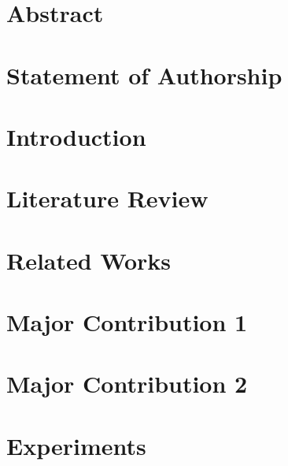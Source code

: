 \documentclass[twoside,openright,titlepage,numbers=noenddot,headinclude,footinclude=true,cleardoublepage=empty,listof=totoc,paper=a4,fontsize=11pt,australian,twoside=semi,DIV=calc]{scrreprt}
\begin{document}
  \frenchspacing
  \raggedbottom
  
  \pagestyle{plain}
  

  \singlespacing
  
  
  
  \onehalfspacing
  
  
  \chapter*{Abstract}
  
  
  \chapter*{Statement of Authorship}
  
  
  
  
  

  
  \cleardoublepage
  \pagestyle{scrheadings}
  \onehalfspacing
  
  \chapter{Introduction}\label{c:Introduction}
  
  \acresetall 
  \chapter{Literature Review}\label{c:Background}
  
  \acresetall 
  \chapter{Related Works}\label{c:Related-Works}
  
  \acresetall 
  \chapter{Major Contribution 1}\label{c:Contribution-1}
  
  \acresetall 
  \chapter{Major Contribution 2}\label{c:Contribution-2}
  
\acresetall 
  \chapter{Experiments}\label{c:Experiments}
  
  \acresetall 
\end{document}
